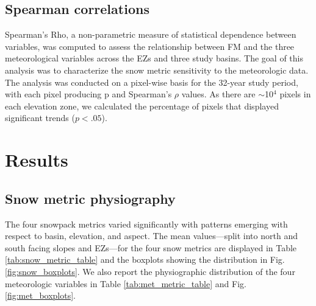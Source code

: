 \hypertarget{ch2-methods-3}{\subsection{Spearman correlations}\label{ch2-methods-3}}

Spearman's Rho, a non-parametric measure of statistical dependence between variables, was computed to assess the relationship between FM and the three meteorological variables across the EZs and three study basins. The goal of this analysis was to characterize the snow metric sensitivity to the meteorologic data. The analysis was conducted on a pixel-wise basis for the 32-year study period, with each pixel producing p and Spearman's $\rho$ values. As there are $\sim$10$^4$ pixels in each elevation zone, we calculated the percentage of pixels that displayed significant trends ($p < .05$).

\hypertarget{ch2-results}{\section{Results}\label{ch2-results}}
\hypertarget{ch2-results-1}{\subsection{Snow metric physiography}\label{ch2-results-1}}

The four snowpack metrics varied significantly with patterns emerging with respect to basin, elevation, and aspect. The mean values---split into north and south facing slopes and EZs---for the four snow metrics are displayed in Table \ref{tab:snow_metric_table} and the boxplots showing the distribution in Fig.\ref{fig:snow_boxplots}. We also report the physiographic distribution of the four meteorologic variables in Table \ref{tab:met_metric_table} and Fig. \ref{fig:met_boxplots}.

